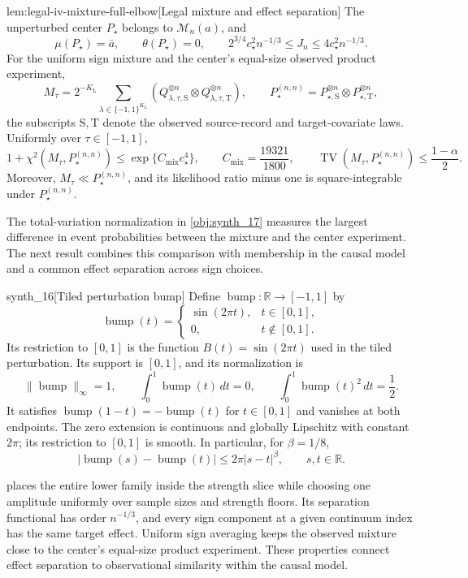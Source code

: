 \begin{lemmav}{lem:legal-iv-mixture-full-elbow}[Legal mixture and effect separation]
The unperturbed center \(P_{\star}\) belongs to
\(\mathcal M_n(a)\), and
\[
\mu(P_{\star})=\bar a,
\qquad
\theta(P_{\star})=0,
\qquad
2^{3/4}c_{\star}^2n^{-1/3}
\le J_n\le4c_{\star}^2n^{-1/3}.
\]
For the uniform sign mixture and the center's equal-size observed product experiment,
\[
M_{\tau}
=
2^{-K_{\mathrm L}}
\sum_{\lambda\in\{-1,1\}^{K_{\mathrm L}}}
\left(Q_{\lambda,\tau,\mathrm S}^{\otimes n}
\otimes Q_{\lambda,\tau,\mathrm T}^{\otimes n}\right),
\qquad
P_{\star}^{(n,n)}
=
P_{\star,\mathrm S}^{\otimes n}
\otimes P_{\star,\mathrm T}^{\otimes n},
\]
the subscripts \(\mathrm S,\mathrm T\) denote the observed source-record and target-covariate laws. Uniformly over \(\tau\in[-1,1]\),
\[
1+\chi^2(M_{\tau},P_{\star}^{(n,n)})
\le
\exp\{C_{\mathrm{mix}}c_{\star}^4\},
\qquad
C_{\mathrm{mix}}=\frac{19321}{1800},
\qquad
\operatorname{TV}(M_{\tau},P_{\star}^{(n,n)})
\le\frac{1-\alpha}{2}.
\]
Moreover, \(M_{\tau}\ll P_{\star}^{(n,n)}\), and its likelihood ratio minus one is square-integrable under \(P_{\star}^{(n,n)}\).
\end{lemmav}

The total-variation normalization in \cref{obj:synth_17} measures the largest difference in event probabilities between the mixture and the center experiment. The next result combines this comparison with membership in the causal model and a common effect separation across sign choices.

\begin{definitionv}{synth_16}[Tiled perturbation bump]
Define \(\operatorname{bump}:\mathbb R\to[-1,1]\) by
\[
\operatorname{bump}(t)=
\begin{cases}
\sin(2\pi t),&t\in[0,1],\\
0,&t\notin[0,1].
\end{cases}
\]
Its restriction to \([0,1]\) is the function \(B(t)=\sin(2\pi t)\) used in the tiled perturbation. Its support is \([0,1]\), and its normalization is
\[
\|\operatorname{bump}\|_\infty=1,\qquad
\int_0^1\operatorname{bump}(t)\,dt=0,\qquad
\int_0^1\operatorname{bump}(t)^2\,dt=\frac12.
\]
It satisfies \(\operatorname{bump}(1-t)=-\operatorname{bump}(t)\) for \(t\in[0,1]\) and vanishes at both endpoints. The zero extension is continuous and globally Lipschitz with constant \(2\pi\); its restriction to \([0,1]\) is smooth. In particular, for \(\beta=1/8\),
\[
|\operatorname{bump}(s)-\operatorname{bump}(t)|
\le 2\pi |s-t|^\beta,\qquad s,t\in\mathbb R.
\]
\end{definitionv}

 places the entire lower family inside the strength slice while choosing one amplitude uniformly over sample sizes and strength floors. Its separation functional  has order \(n^{-1/3}\), and every sign component at a given continuum index has the same target effect. Uniform sign averaging keeps the observed mixture close to the center's equal-size product experiment. These properties connect effect separation to observational similarity within the causal model.

